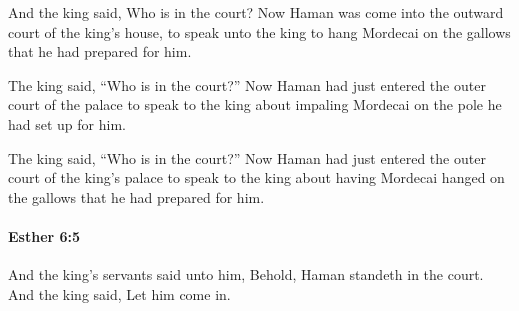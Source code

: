 			\begin{versebox}
					\item[BHS] 
					\item[LXX] 
					\item[ASV] And the king said, Who is in the court? Now Haman was come into the outward court of the king's house, to speak unto the king to hang Mordecai on the gallows that he had prepared for him.
					\item[NIV] The king said, “Who is in the court?” Now Haman had just entered the outer court of the palace to speak to the king about impaling Mordecai on the pole he had set up for him.
					\item[NRSV] The king said, “Who is in the court?” Now Haman had just entered the outer court of the king’s palace to speak to the king about having Mordecai hanged on the gallows that he had prepared for him.
			\end{versebox}

		\paragraph{Esther 6:5} %
			\label{ESTHER-6-5}

			And the king’s servants said unto him, Behold, Haman standeth in the court. And the king said, Let him come in.

